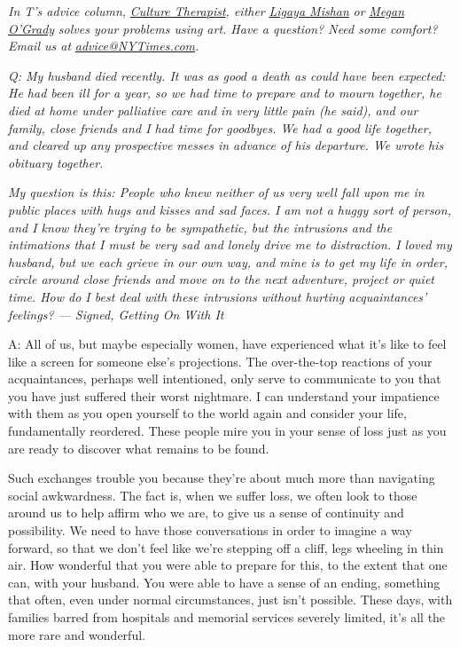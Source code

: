 \emph{In T's advice column,}
\href{https://www.nytimes3xbfgragh.onion/column/culture-therapist?module=inline}{\emph{Culture
Therapist}}\emph{, either}
\href{https://www.nytimes3xbfgragh.onion/by/ligaya-mishan?module=inline}{\emph{Ligaya
Mishan}} \emph{or}
\href{https://www.nytimes3xbfgragh.onion/by/megan-o-grady?module=inline}{\emph{Megan
O'Grady}} \emph{solves your problems using art. Have a question? Need
some comfort? Email us at}
\href{mailto:advice@NYTimes.com}{\emph{advice@NYTimes.com}}\emph{.}

\emph{Q: My husband died recently. It was as good a death as could have
been expected: He had been ill for a year, so we had time to prepare and
to mourn together, he died at home under palliative care and in very
little pain (he said), and our family, close friends and I had time for
goodbyes. We had a good life together, and cleared up any prospective
messes in advance of his departure. We wrote his obituary together.}

\emph{My question is this: People who knew neither of us very well fall
upon me in public places with hugs and kisses and sad faces. I am not a
huggy sort of person, and I know they're trying to be sympathetic, but
the intrusions and the intimations that I must be very sad and lonely
drive me to distraction. I loved my husband, but we each grieve in our
own way, and mine is to get my life in order, circle around close
friends and move on to the next adventure, project or quiet time. How do
I best deal with these intrusions without hurting acquaintances'
feelings? --- Signed, Getting On With It}

A: All of us, but maybe especially women, have experienced what it's
like to feel like a screen for someone else's projections. The
over-the-top reactions of your acquaintances, perhaps well intentioned,
only serve to communicate to you that you have just suffered their worst
nightmare. I can understand your impatience with them as you open
yourself to the world again and consider your life, fundamentally
reordered. These people mire you in your sense of loss just as you are
ready to discover what remains to be found.

Such exchanges trouble you because they're about much more than
navigating social awkwardness. The fact is, when we suffer loss, we
often look to those around us to help affirm who we are, to give us a
sense of continuity and possibility. We need to have those conversations
in order to imagine a way forward, so that we don't feel like we're
stepping off a cliff, legs wheeling in thin air. How wonderful that you
were able to prepare for this, to the extent that one can, with your
husband. You were able to have a sense of an ending, something that
often, even under normal circumstances, just isn't possible. These days,
with families barred from hospitals and memorial services severely
limited, it's all the more rare and wonderful.

